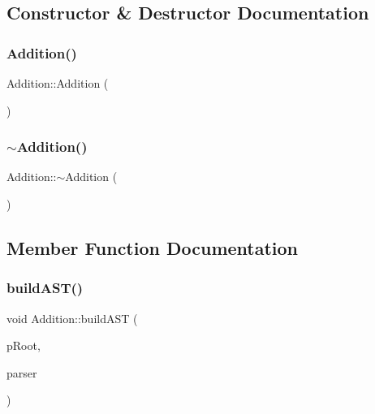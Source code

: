 \subsection{Constructor \& Destructor Documentation}
\mbox{\label{class_addition_a1e7555afe9d415aa65b528c04d8ab3a0}} 
\subsubsection{\texorpdfstring{Addition()}{Addition()}}
{\footnotesize\ttfamily Addition\+::\+Addition (\begin{DoxyParamCaption}{ }\end{DoxyParamCaption})}

\mbox{\label{class_addition_a66f0b31feefaaa51701e78b2a366b840}} 
\subsubsection{\texorpdfstring{$\sim$Addition()}{~Addition()}}
{\footnotesize\ttfamily Addition\+::$\sim$\+Addition (\begin{DoxyParamCaption}{ }\end{DoxyParamCaption})}



\subsection{Member Function Documentation}
\mbox{\label{class_addition_a5cd97a6e56814cfe24a1211aeaab907f}} 
\subsubsection{\texorpdfstring{buildAST()}{buildAST()}}
{\footnotesize\ttfamily void Addition\+::build\+A\+ST (\begin{DoxyParamCaption}\item[{std\+::unique\+\_\+ptr$<$ \mbox{\hyperlink{class_abstract_expression}{Abstract\+Expression}} $>$ \&}]{p\+Root,  }\item[{\mbox{\hyperlink{class_parser}{Parser}} \&}]{parser }\end{DoxyParamCaption})\hspace{0.3cm}{\ttfamily [virtual]}}



